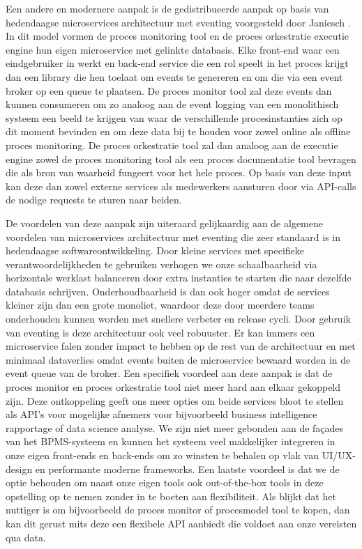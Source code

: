 Een andere en modernere aanpak is de gedistribueerde aanpak op basis van hedendaagse microservices architectuur met eventing voorgesteld door Janiesch \autocite[pp. 8-22]{Janiesch2012}. In dit model vormen de proces monitoring tool en de proces orkestratie executie engine hun eigen microservice met gelinkte databasis. Elke front-end waar een eindgebruiker in werkt en back-end service die een rol speelt in het proces krijgt dan een library die hen toelaat om events te genereren en om die via een event broker op een queue te plaatsen. De proces monitor tool zal deze events dan kunnen consumeren om zo analoog aan de event logging van een monolithisch systeem een beeld te krijgen van waar de verschillende procesinstanties zich op dit moment bevinden en om deze data bij te houden voor zowel online als offline proces monitoring. De proces orkestratie tool zal dan analoog aan de executie engine zowel de proces monitoring tool als een proces documentatie tool bevragen die als bron van waarheid fungeert voor het hele proces. Op basis van deze input kan deze dan zowel externe services als medewerkers aansturen door via API-calls de nodige requests te sturen naar beiden. \newline

De voordelen van deze aanpak zijn uiteraard gelijkaardig aan de algemene voordelen van microservices architectuur met eventing die zeer standaard is in hedendaagse softwareontwikkeling. Door kleine services met specifieke verantwoordelijkheden te gebruiken verhogen we onze schaalbaarheid via horizontale werklast balanceren door extra instanties te starten die naar dezelfde databasis schrijven. Onderhoudbaarheid is dan ook hoger omdat de services kleiner zijn dan een grote monoliet, waardoor deze door meerdere teams onderhouden kunnen worden met snellere verbeter en release cycli. Door gebruik van eventing is deze architectuur ook veel robuuster. Er kan immers een microservice falen zonder impact te hebben op de rest van de architectuur en met minimaal dataverlies omdat events buiten de microservice bewaard worden in de event queue van de broker. Een specifiek voordeel aan deze aanpak is dat de proces monitor en proces orkestratie tool niet meer hard aan elkaar gekoppeld zijn. Deze ontkoppeling geeft ons meer opties om beide services bloot te stellen als API’s voor mogelijke afnemers voor bijvoorbeeld business intelligence rapportage of data science analyse. We zijn niet meer gebonden aan de façades van het BPMS-systeem en kunnen het systeem veel makkelijker integreren in onze eigen front-ends en back-ends om zo winsten te behalen op vlak van UI/UX-design en performante moderne frameworks. Een laatste voordeel is dat we de optie behouden om naast onze eigen tools ook out-of-the-box tools in deze opstelling op te nemen zonder in te boeten aan flexibiliteit. Als blijkt dat het nuttiger is om bijvoorbeeld de proces monitor of procesmodel tool te kopen, dan kan dit gerust mits deze een flexibele API aanbiedt die voldoet aan onze vereisten qua data. \newline

